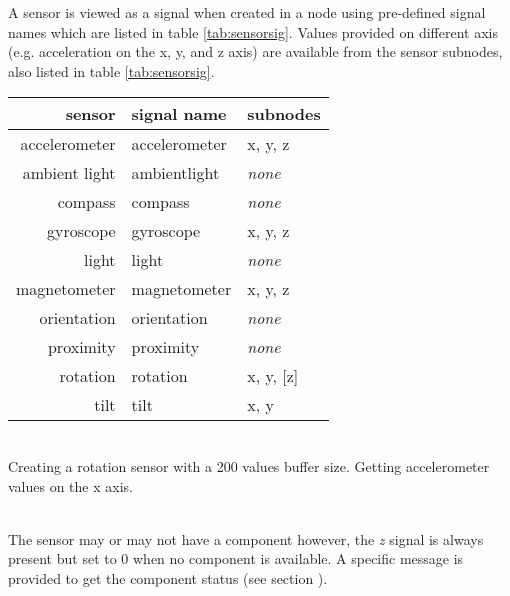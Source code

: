 
A sensor is viewed as a signal when created in a  node using pre-defined signal names which are listed in table \ref{tab:sensorsig}. Values provided on different axis (e.g. acceleration on the x, y, and z axis) are available from the sensor subnodes, also listed in table \ref{tab:sensorsig}. 

\begin{table*}[htbp]
\begin{center}
\begin{tabular}{rll}
\hline
sensor & signal name		&	subnodes \\
\hline
accelerometer	& accelerometer		& x, y, z \\
ambient light	& ambientlight		& \textit{none} \\
compass			& compass			& \textit{none} \\
gyroscope		& gyroscope			& x, y, z \\
light			& light				& \textit{none} \\
magnetometer	& magnetometer		& x, y, z \\
orientation		& orientation		& \textit{none} \\
proximity		& proximity			& \textit{none} \\
rotation		& rotation			& x, y, [z] \\
tilt			& tilt 				& x, y \\
\hline
\end{tabular}
\end{center}
\label{tab:sensorsig}
\caption{Sensor's signal names and subnodes}
\end{table*}


\example \\
Creating a rotation sensor with a 200 values buffer size.
Getting accelerometer values on the x axis.

\note\\
The  sensor may or may not have a  component however, the \textit{z} signal is always present but set to 0 when no  component is available. A specific message is provided to get the  component status (see section ).




